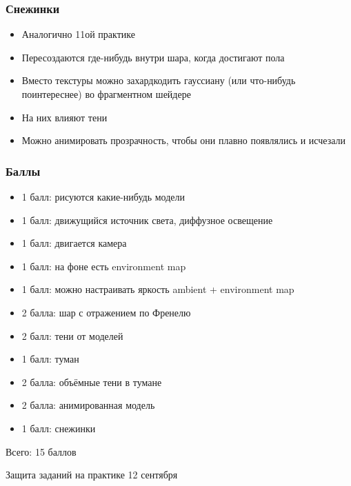 \documentclass{beamer}
\begin{document}
\begin{frame}[fragile]
\frametitle{Снежинки}
\begin{itemize}
\item Аналогично 11ой практике
\item Пересоздаются где-нибудь внутри шара, когда достигают пола
\item Вместо текстуры можно захардкодить гауссиану (или что-нибудь поинтереснее) во фрагментном шейдере
\item На них влияют тени
\item Можно анимировать прозрачность, чтобы они плавно появлялись и исчезали
\end{itemize}
\end{frame}

\begin{frame}[fragile]
\frametitle{Баллы}
\begin{itemize}
\item 1 балл: рисуются какие-нибудь модели
\item 1 балл: движущийся источник света, диффузное освещение
\item 1 балл: двигается камера
\item 1 балл: на фоне есть environment map
\item 1 балл: можно настраивать яркость ambient + environment map
\item 2 балла: шар с отражением по Френелю
\item 2 балл: тени от моделей
\item 1 балл: туман
\item 2 балла: объёмные тени в тумане
\item 2 балла: анимированная модель
\item 1 балл: снежинки
\end{itemize}
Всего: 15 баллов

Защита заданий на практике 12 сентября
\end{frame}
\end{document}
